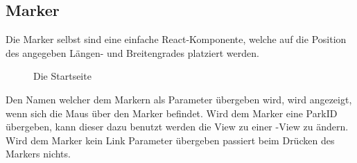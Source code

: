 \subsection{Marker}

Die Marker selbst sind eine einfache React-Komponente, welche auf die Position des angegeben Längen- und
Breitengrades platziert werden. 

\begin{figure}[H]
    \begin{center}
      \caption{Die Startseite}
    \end{center}
\end{figure}

Den Namen welcher dem Markern als Parameter übergeben wird, wird angezeigt, wenn sich die Maus über den 
Marker befindet. Wird dem Marker eine ParkID übergeben, kann dieser dazu benutzt werden die 
View zu einer \underline{}-View zu ändern. Wird dem Marker kein Link Parameter übergeben
passiert beim Drücken des Markers nichts.
